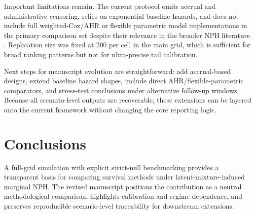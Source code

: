 \documentclass[11pt]{article}
\begin{document}
Important limitations remain. The current protocol omits accrual and administrative censoring, relies on exponential baseline hazards, and does not include full weighted-Cox/AHR or flexible parametric model implementations in the primary comparison set despite their relevance in the broader NPH literature \citep{schemper2009,royston2002}. Replication size was fixed at 200 per cell in the main grid, which is sufficient for broad ranking patterns but not for ultra-precise tail calibration.

Next steps for manuscript evolution are straightforward: add accrual-based designs, extend baseline hazard shapes, include direct AHR/flexible-parametric comparators, and stress-test conclusions under alternative follow-up windows. Because all scenario-level outputs are recoverable, these extensions can be layered onto the current framework without changing the core reporting logic.

\section{Conclusions}
A full-grid simulation with explicit strict-null benchmarking provides a transparent basis for comparing survival methods under latent-mixture-induced marginal NPH. The revised manuscript positions the contribution as a neutral methodological comparison, highlights calibration and regime dependence, and preserves reproducible scenario-level traceability for downstream extensions.

\nocite{*}


\end{document}
